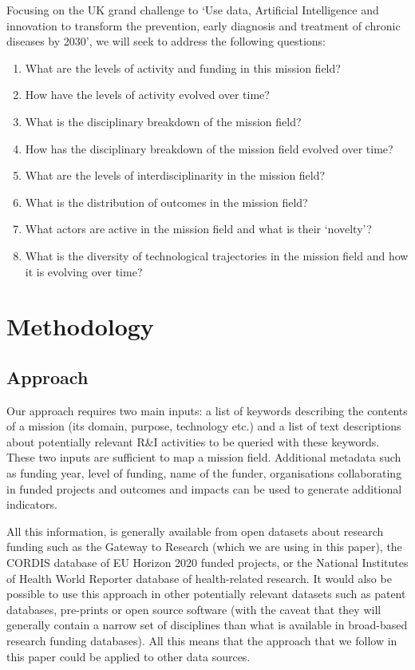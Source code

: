 \documentclass[11pt]{article}
\begin{document}
Focusing on the UK grand challenge to `Use data, Artificial Intelligence and innovation to transform the prevention, early diagnosis and treatment of chronic diseases by 2030', we will seek to address the following questions:

\begin{enumerate}
    \item What are the levels of activity and funding in this mission field?
    \item How have the levels of activity evolved over time?
    \item What is the disciplinary breakdown of the mission field?
    \item How has the disciplinary breakdown of the mission field evolved over time?
    \item What are the levels of interdisciplinarity in the mission field?
    \item What is the distribution of outcomes in the mission field?
    \item What actors are active in the mission field and what is their `novelty’?
    \item What is the diversity of technological trajectories in the mission field and how it is evolving over time?

\end{enumerate}

\section{Methodology}



\subsection{Approach}

Our approach requires two main inputs: a list of keywords describing the contents of a mission (its domain, purpose, technology etc.) and a list of text descriptions about potentially relevant R&I activities to be queried with these keywords. These two inputs are sufficient to map a mission field. Additional metadata such as funding year, level of funding, name of the funder, organisations collaborating in funded projects and outcomes and impacts can be used to  generate additional indicators. 

All this information, is generally available from open datasets about research funding such as the Gateway to Research (which we are using in this paper), the CORDIS database of EU Horizon 2020 funded projects, or the National Institutes of Health World Reporter database of health-related research. It would also be possible to use this approach in other potentially relevant datasets such as patent databases, pre-prints or open source software (with the caveat that they will generally contain a narrow set of disciplines than what is available in broad-based research funding databases). All this means that the approach that we follow in this paper could be applied to other data sources.
\end{document}
